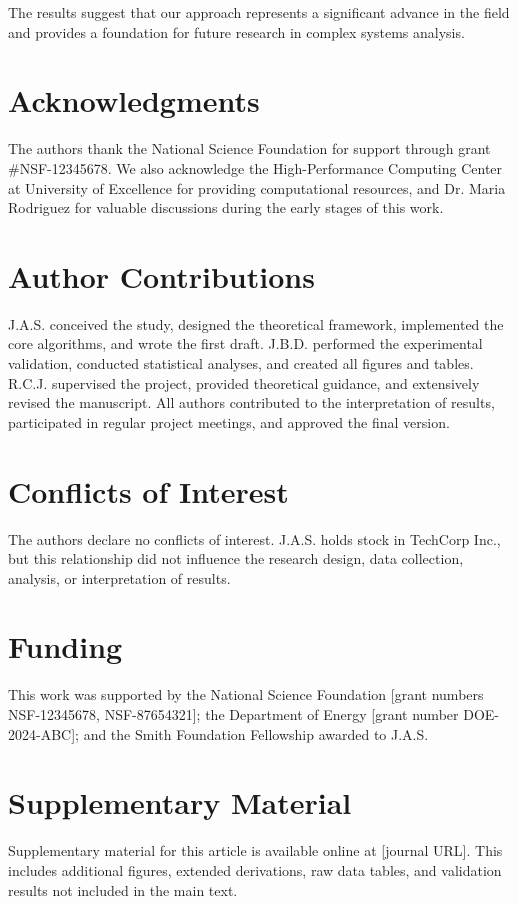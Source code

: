 \documentclass[12pt, letterpaper, onecolumn, final]{article}
\theoremstyle{plain}
\theoremstyle{definition}
\theoremstyle{remark}
\begin{document}
\lipsum[55] The results suggest that our approach represents a significant advance in the field and provides a foundation for future research in complex systems analysis.

\section*{Acknowledgments}

The authors thank the National Science Foundation for support through grant \#NSF-12345678. We also acknowledge the High-Performance Computing Center at University of Excellence for providing computational resources, and Dr. Maria Rodriguez for valuable discussions during the early stages of this work.

\section*{Author Contributions}

J.A.S. conceived the study, designed the theoretical framework, implemented the core algorithms, and wrote the first draft. J.B.D. performed the experimental validation, conducted statistical analyses, and created all figures and tables. R.C.J. supervised the project, provided theoretical guidance, and extensively revised the manuscript. All authors contributed to the interpretation of results, participated in regular project meetings, and approved the final version.

\section*{Conflicts of Interest}

The authors declare no conflicts of interest. J.A.S. holds stock in TechCorp Inc., but this relationship did not influence the research design, data collection, analysis, or interpretation of results.

\section*{Funding}
This work was supported by the National Science Foundation [grant numbers NSF-12345678, NSF-87654321]; the Department of Energy [grant number DOE-2024-ABC]; and the Smith Foundation Fellowship awarded to J.A.S.

\section*{Supplementary Material}
Supplementary material for this article is available online at [journal URL]. This includes additional figures, extended derivations, raw data tables, and validation results not included in the main text.
\end{document}
